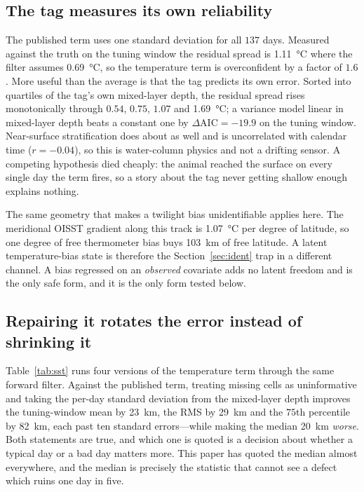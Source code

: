 \documentclass[conference]{IEEEtran}
\begin{document}
\subsection{The tag measures its own reliability}

The published term uses one standard deviation for all $137$ days. Measured
against the truth on the tuning window the residual spread is
\SI{1.11}{\celsius} where the filter assumes \SI{0.69}{\celsius}, so the
temperature term is overconfident by a factor of $1.6$. More useful than the
average is that the tag predicts its own error. Sorted into quartiles of the
tag's own mixed-layer depth, the residual spread rises monotonically through
$0.54$, $0.75$, $1.07$ and \SI{1.69}{\celsius}; a variance model linear in
mixed-layer depth beats a constant one by $\Delta\mathrm{AIC}=-19.9$ on the
tuning window. Near-surface stratification does about as well and is
uncorrelated with calendar time ($r=-0.04$), so this is water-column physics and
not a drifting sensor. A competing hypothesis died cheaply: the animal reached
the surface on every single day the term fires, so a story about the tag never
getting shallow enough explains nothing.

The same geometry that makes a twilight bias unidentifiable applies here. The
meridional OISST gradient along this track is \SI{1.07}{\celsius} per degree of
latitude, so one degree of free thermometer bias buys \SI{103}{\km} of free
latitude. A latent temperature-bias state is therefore the
Section~\ref{sec:ident} trap in a different channel. A bias regressed on an
\emph{observed} covariate adds no latent freedom and is the only safe form, and
it is the only form tested below.

\subsection{Repairing it rotates the error instead of shrinking it}

Table~\ref{tab:sst} runs four versions of the temperature term through the same
forward filter. Against the published term, treating missing cells as
uninformative and taking the per-day standard deviation from the mixed-layer
depth improves the tuning-window mean by \SI{23}{\km}, the RMS by \SI{29}{\km}
and the $75$th percentile by \SI{82}{\km}, each past ten standard errors---while
making the median \SI{20}{\km} \emph{worse}. Both statements are true, and which
one is quoted is a decision about whether a typical day or a bad day matters
more. This paper has quoted the median almost everywhere, and the median is
precisely the statistic that cannot see a defect which ruins one day in five.
\end{document}

